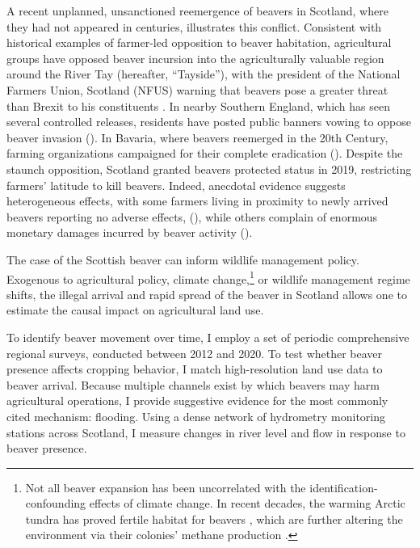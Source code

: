 A recent unplanned, unsanctioned reemergence of beavers in Scotland, where they had not appeared in centuries, illustrates this conflict. Consistent with historical examples of farmer-led opposition to beaver habitation, agricultural groups have opposed beaver incursion into the agriculturally valuable region around the River Tay (hereafter, ``Tayside''), with the president of the National Farmers Union, Scotland (NFUS) warning that beavers pose a greater threat than Brexit to his constituents \citep{castle_beavers_2021}. In nearby Southern England, which has seen several controlled releases, residents have posted public banners vowing to oppose beaver invasion (\cite{itooksomephotos_say_2022}).  In Bavaria, where beavers reemerged in the 20th Century, farming organizations campaigned for their complete eradication (\cite{campbell-palmer_managing_2015}). Despite the staunch opposition, Scotland granted beavers protected status in 2019, restricting farmers' latitude to kill beavers. Indeed, anecdotal evidence suggests heterogeneous effects, with some farmers living in proximity to newly arrived beavers reporting no adverse effects, (\cite{campbell_rd_naturescot_2012}), while others complain of enormous monetary damages incurred by beaver activity (\cite{hamilton_tayside_2015}).

The case of the Scottish beaver can inform wildlife management policy. Exogenous to agricultural policy, climate change,\footnote{Not all beaver expansion has been uncorrelated with the identification-confounding effects of climate change. In recent decades, the warming Arctic tundra has proved fertile habitat for beavers \citep{tape_expanding_2022}, which are further altering the environment via their colonies' methane production \citep{clark_beaver_2023}.} or wildlife management regime shifts, the illegal arrival and rapid spread of the beaver in Scotland  allows one to estimate the causal impact on agricultural land use.

To identify beaver movement over time, I employ a set of periodic comprehensive regional surveys, conducted between 2012 and 2020. To test whether beaver presence affects cropping behavior, I match high-resolution land use data to beaver arrival. Because multiple channels exist by which beavers may harm agricultural operations, I provide suggestive evidence for the most commonly cited mechanism: flooding. Using a dense network of hydrometry monitoring stations across Scotland, I measure changes in river level and flow in response to beaver presence.

